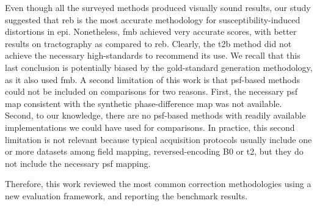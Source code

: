 Even though all the surveyed methods produced visually sound results,
our study suggested that \gls*{reb} is the most accurate
methodology for susceptibility-induced distortions in
\gls*{epi}. Nonetheless, \gls*{fmb} achieved very accurate
scores, with better results on tractography as compared to
\gls*{reb}. Clearly, the \gls*{t2b} method did not achieve
the necessary high-standards to recommend its use.
We recall that this last conclusion is potentially biased 
by the gold-standard generation
methodology, as it also used \gls*{fmb}.
A second limitation of this work is that \gls*{psf}-based methods 
could not be included on comparisons for two reasons.
First, the necessary \gls*{psf} map consistent with the synthetic
phase-difference map was not available. Second, to our knowledge,
there are no \gls*{psf}-based methods with readily available 
implementations we could have used for comparisons. 
In practice, this second limitation is not relevant because
typical acquisition protocols usually include one or more
datasets among field mapping, reversed-encoding B0 or \gls*{t2},
but they do not include the necessary \gls*{psf} mapping.

Therefore, this work reviewed the most common
correction methodologies using a new evaluation
framework, and reporting the benchmark results.
